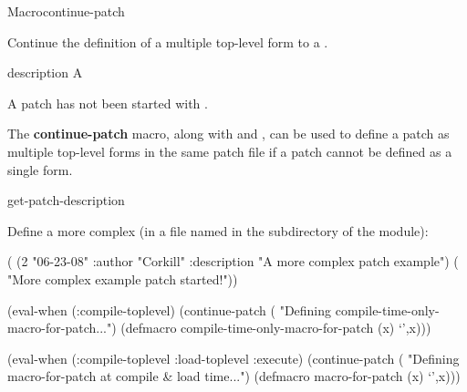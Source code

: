 \documentclass[10pt,twoside,english,pdftex]{article}
\begin{document}

\begin{functiondoc}{Macro}{continue-patch}{\superstar}
%
%

\fnsyntax 

\fnpurpose Continue the definition of a multiple top-level form  to
a .

\fnpackage {}

\fnmodule {}

\fnargs
\begin{args}{description}
\arg[form] A 
\end{args}

\fnerrors
A patch has not been started with .

\fndescription 
%
The \textbf{continue-patch} macro, along with
 and
, can be used to define a patch as
multiple top-level forms in the same patch file if a patch cannot be defined
as a single  form.

\begin{alsos}{get-patch-description}
\also[patch]
\also[undefmethod]
\end{alsos}

\fnexample 
%
Define a more complex  (in a file named
 in the  subdirectory of
the module):
%
%
%
%
%
\W\supp
\begin{example}
  ( (2 "06-23-08" 
                  :author "Corkill"
                  :description "A more complex patch example")
      ( "More complex example patch started!"))

  (eval-when (:compile-toplevel)
    (continue-patch
     ( "Defining compile-time-only-macro-for-patch...")
     (defmacro compile-time-only-macro-for-patch (x)
       `',x)))

  (eval-when (:compile-toplevel :load-toplevel :execute)
    (continue-patch
     ( "Defining macro-for-patch at compile & load time...")
     (defmacro macro-for-patch (x)
       `',x)))\goodpagebreak


\end{example}
\end{functiondoc}
\end{document}

